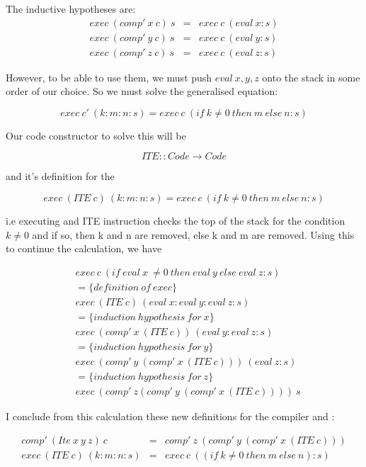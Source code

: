 \documentclass {article}
\begin{document}
The inductive hypotheses are:
\begin{eqnarray*}
	exec \ (comp' \ x \ c) \ s &=& exec \ c \ (eval \ x:s) \\
	exec \ (comp' \ y \ c) \ s &=& exec \ c \ (eval \ y:s) \\
	exec \ (comp' \ z \ c) \ s &=& exec \ c \ (eval \ z:s)
\end{eqnarray*}

However, to be able to use them,
we must push $eval \ x,y,z$ onto the stack
in some order of our choice.
So we must solve the generalised equation:

	\[ exec \ c' \ (k:m:n:s) 
		= exec \ c \ (if \ k \not= 0 \ then \ m \ else \ n:s)\]

Our code constructor to solve this will be

	\[ ITE :: Code \rightarrow Code \]

and it's definition for the \vm

	\[ exec \ (ITE \ c) \ (k:m:n:s) 
		= exec \ c \ (if \ k \not= 0 \ then \ m \ else \ n:s) \]

i.e executing and ITE instruction
checks the top of the stack for the condition $k \not= 0$
and if so, then k and n are removed,
else k and m are removed.
Using this to continue the calculation, we have

\begin{align*}
	&exec \ c \ (if \ eval \ x \ \not= 0 \ then \ eval \ y \ else \ eval \ z :s) \\
	&= \{definition \ of \ exec\} \\
	&exec \ (ITE \ c) \ (eval \ x:eval \ y:eval \ z:s) \\
	&= \{induction\ hypothesis\ for\ x\} \\
	&exec \ (comp' \ x \ (ITE \ c)) \ (eval \ y:eval \ z:s) \\
	&= \{induction\ hypothesis\ for\ y\} \\
	&exec \ (comp' \ y \ (comp' \ x \ (ITE \ c))) \ (eval \ z:s) \\
	&= \{induction\ hypothesis\ for\ z\} \\
	&exec \ (comp' \ z (comp' \ y \ (comp' \ x \ (ITE \ c)))) \ s
\end{align*}

I conclude from this calculation these new definitions
for the compiler and \vm: 

\begin{eqnarray}
	comp' \ (Ite \ x \ y \ z) \ c &=&  comp' \ z \ (comp' \ y \ (comp' \ x \ (ITE \ c))) \label{compite}\\
	exec \ (ITE \ c) \ (k:m:n:s) &=& exec \ c \ ((if \ k \not= 0 \ then \ m \ else \ n):s) \label{execite}
\end{eqnarray}
\end{document}

